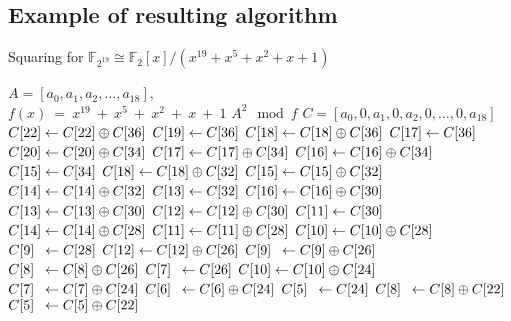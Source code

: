 \documentclass{ufscThesis}
\newcommand{\F}{\mathbb{F}}
\newcommand{\mathbox}[3][l]{\makebox[\widthof{$#2$}][#1]{$#3$}}
\begin{document}
\begin{appendices}

\section{Example of resulting algorithm}
\label{appendix:example}

\begin{algorithm}
\caption{Squaring for $\F_{2^{19}} \cong \F_2[x]/(x^{19} + x^5 + x^2 + x + 1)$}
\label{alg:square:example}
\begin{multicols}{2}
\begin{algorithmic}[1]
\REQUIRE $A = [a_0, a_1, a_2, ..., a_{18}]$, \\$f(x)~=~x^{19}~+~x^5~+~x^2~+~x~+~1$
\ENSURE $A^2 \mod f$
\STATE $C = [a_0, 0, a_1, 0, a_2, 0, \ldots, 0, a_{18}]$
\STATE $\mathbox{C[22]}{C[22]} \leftarrow C[22]  \oplus  C[36]$
\STATE $\mathbox{C[22]}{C[19]} \leftarrow C[36]$
\STATE $\mathbox{C[22]}{C[18]} \leftarrow C[18]  \oplus  C[36]$
\STATE $\mathbox{C[22]}{C[17]} \leftarrow C[36]$
\STATE $\mathbox{C[22]}{C[20]} \leftarrow C[20]  \oplus  C[34]$
\STATE $\mathbox{C[22]}{C[17]} \leftarrow C[17]  \oplus  C[34]$
\STATE $\mathbox{C[22]}{C[16]} \leftarrow C[16]  \oplus  C[34]$
\STATE $\mathbox{C[22]}{C[15]} \leftarrow C[34]$
\STATE $\mathbox{C[22]}{C[18]} \leftarrow C[18]  \oplus  C[32]$
\STATE $\mathbox{C[22]}{C[15]} \leftarrow C[15]  \oplus  C[32]$
\STATE $\mathbox{C[22]}{C[14]} \leftarrow C[14]  \oplus  C[32]$
\STATE $\mathbox{C[22]}{C[13]} \leftarrow C[32]$
\STATE $\mathbox{C[22]}{C[16]} \leftarrow C[16]  \oplus  C[30]$
\STATE $\mathbox{C[22]}{C[13]} \leftarrow C[13]  \oplus  C[30]$
\STATE $\mathbox{C[22]}{C[12]} \leftarrow C[12]  \oplus  C[30]$
\STATE $\mathbox{C[22]}{C[11]} \leftarrow C[30]$
\STATE $\mathbox{C[22]}{C[14]} \leftarrow C[14]  \oplus  C[28]$
\STATE $\mathbox{C[22]}{C[11]} \leftarrow C[11]  \oplus  C[28]$
\STATE $\mathbox{C[22]}{C[10]} \leftarrow C[10]  \oplus  C[28]$
\STATE $\mathbox{C[22]}{C[9]} \leftarrow C[28]$
\STATE $\mathbox{C[22]}{C[12]} \leftarrow C[12]  \oplus  C[26]$
\STATE $\mathbox{C[22]}{C[9]} \leftarrow C[9]  \oplus  C[26]$
\STATE $\mathbox{C[22]}{C[8]} \leftarrow C[8]  \oplus  C[26]$
\STATE $\mathbox{C[22]}{C[7]} \leftarrow C[26]$
\STATE $\mathbox{C[22]}{C[10]} \leftarrow C[10]  \oplus  C[24]$
\STATE $\mathbox{C[22]}{C[7]} \leftarrow C[7]  \oplus  C[24]$
\STATE $\mathbox{C[22]}{C[6]} \leftarrow C[6]  \oplus  C[24]$
\STATE $\mathbox{C[22]}{C[5]} \leftarrow C[24]$
\STATE $\mathbox{C[22]}{C[8]} \leftarrow C[8]  \oplus  C[22]$
\STATE $\mathbox{C[22]}{C[5]} \leftarrow C[5]  \oplus  C[22]$

\end{algorithmic}
\end{multicols}
\end{algorithm}
\end{appendices}
\end{document}
